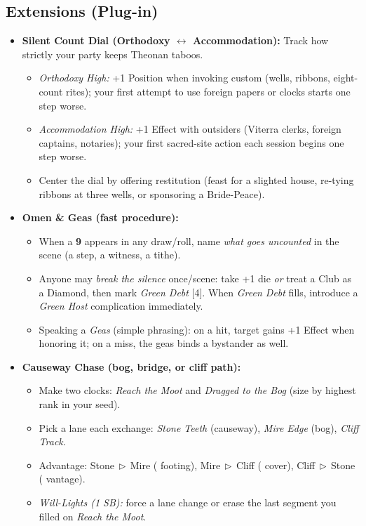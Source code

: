 \subsection*{Extensions (Plug-in)}
\label{sec:theona-extensions}
\begin{itemize}
  \item \textbf{Silent Count Dial (Orthodoxy \(\leftrightarrow\) Accommodation):} Track how strictly your party keeps Theonan taboos.
  \begin{itemize}
    \item \emph{Orthodoxy High:} +1 Position when invoking custom (wells, ribbons, eight-count rites); your first attempt to use foreign papers or clocks starts one step worse.
    \item \emph{Accommodation High:} +1 Effect with outsiders (Viterra clerks, foreign captains, notaries); your first sacred-site action each session begins one step worse.
    \item Center the dial by offering restitution (feast for a slighted house, re-tying ribbons at three wells, or sponsoring a Bride-Peace).
  \end{itemize}

  \item \textbf{Omen \& Geas (fast procedure):}
  \begin{itemize}
    \item When a \textbf{9} appears in any draw/roll, name \emph{what goes uncounted} in the scene (a step, a witness, a tithe).  
    \item Anyone may \emph{break the silence} once/scene: take +1 die \emph{or} treat a Club as a Diamond, then mark \emph{Green Debt} [4]. When \emph{Green Debt} fills, introduce a \emph{Green Host} complication immediately.
    \item Speaking a \emph{Geas} (simple phrasing): on a hit, target gains +1 Effect when honoring it; on a miss, the geas binds a bystander as well.
  \end{itemize}

  \item \textbf{Causeway Chase (bog, bridge, or cliff path):}
  \begin{itemize}
    \item Make two clocks: \emph{Reach the Moot} and \emph{Dragged to the Bog} (size by highest rank in your seed).
    \item Pick a lane each exchange: \emph{Stone Teeth} (causeway), \emph{Mire Edge} (bog), \emph{Cliff Track}.  
    \item Advantage: Stone\(\,\triangleright\,\)Mire ( footing), Mire\(\,\triangleright\,\)Cliff ( cover), Cliff\(\,\triangleright\,\)Stone ( vantage).
    \item \emph{Will-Lights (1 SB):} force a lane change or erase the last segment you filled on \emph{Reach the Moot}.
  \end{itemize}


\end{itemize}
